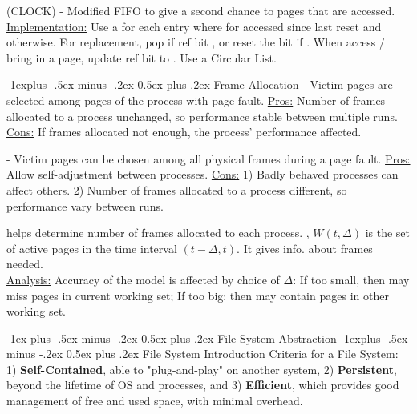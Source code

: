 \documentclass[10pt,landscape,letterpaper]{article}
\makeatletter
\renewcommand{\section}{\@startsection{section}{1}{0mm}%
                                {-1ex plus -.5ex minus -.2ex}%
                                {0.5ex plus .2ex}%
                                {\sffamily\large}}
\renewcommand{\subsection}{\@startsection{subsection}{2}{0mm}%
                                {-1explus -.5ex minus -.2ex}%
                                {0.5ex plus .2ex}%
                                {\sffamily\normalsize\itshape}}
\makeatother
\begin{document}
\begin{multicols}{3}
\medskip

 (CLOCK) - Modified FIFO to give a second chance to pages that are accessed. 
\\
\underline{Implementation:} Use a  for each entry where  for accessed since last reset and  otherwise. For replacement, pop if ref bit , or reset the bit if . When access / bring in a page, update ref bit to . Use a Circular List.


\subsection{Frame Allocation}
 - Victim pages are selected among pages of the process with page fault. \underline{Pros:} Number of frames allocated to a process unchanged, so performance stable between multiple runs. \underline{Cons:} If frames allocated not enough, the process' performance affected.

\medskip

 - Victim pages can be chosen among all physical frames during a page fault. \underline{Pros:} Allow self-adjustment between processes. \underline{Cons:} 1) Badly behaved processes can affect others. 2) Number of frames allocated to a process different, so performance vary between runs.

\medskip

 helps determine number of frames allocated to each process. , $W(t, \Delta)$ is the set of active pages in the time interval $(t - \Delta, t)$. It gives info. about frames needed.
\\
\underline{Analysis:} Accuracy of the model is affected by choice of $\Delta$: If too small, then may miss pages in current working set; If too big: then may contain pages in other working set.




\section{File System Abstraction}
\subsection{File System Introduction}
Criteria for a File System: 1) \textbf{Self-Contained}, able to "plug-and-play" on another system, 2) \textbf{Persistent}, beyond the lifetime of OS and processes, and 3) \textbf{Efficient}, which provides good management of free and used space, with minimal overhead.


\end{multicols}
\end{document}
